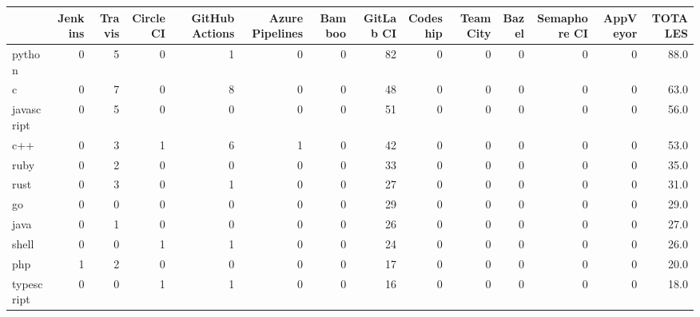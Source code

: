 \begin{tabular}{lrrrrrrrrrrrrr}
\toprule
{} &  Jenkins &  Travis &  Circle CI &  GitHub Actions &  Azure Pipelines &  Bamboo &  GitLab CI &  Codeship &  TeamCity &  Bazel &  Semaphore CI &  AppVeyor &  TOTALES \\
\midrule
python           &        0 &       5 &          0 &               1 &                0 &       0 &         82 &         0 &         0 &      0 &             0 &         0 &     88.0 \\
c                &        0 &       7 &          0 &               8 &                0 &       0 &         48 &         0 &         0 &      0 &             0 &         0 &     63.0 \\
javascript       &        0 &       5 &          0 &               0 &                0 &       0 &         51 &         0 &         0 &      0 &             0 &         0 &     56.0 \\
c++              &        0 &       3 &          1 &               6 &                1 &       0 &         42 &         0 &         0 &      0 &             0 &         0 &     53.0 \\
ruby             &        0 &       2 &          0 &               0 &                0 &       0 &         33 &         0 &         0 &      0 &             0 &         0 &     35.0 \\
rust             &        0 &       3 &          0 &               1 &                0 &       0 &         27 &         0 &         0 &      0 &             0 &         0 &     31.0 \\
go               &        0 &       0 &          0 &               0 &                0 &       0 &         29 &         0 &         0 &      0 &             0 &         0 &     29.0 \\
java             &        0 &       1 &          0 &               0 &                0 &       0 &         26 &         0 &         0 &      0 &             0 &         0 &     27.0 \\
shell            &        0 &       0 &          1 &               1 &                0 &       0 &         24 &         0 &         0 &      0 &             0 &         0 &     26.0 \\
php              &        1 &       2 &          0 &               0 &                0 &       0 &         17 &         0 &         0 &      0 &             0 &         0 &     20.0 \\
typescript       &        0 &       0 &          1 &               1 &                0 &       0 &         16 &         0 &         0 &      0 &             0 &         0 &     18.0 \\

\end{tabular}
